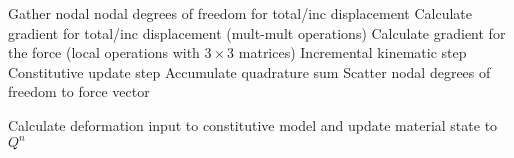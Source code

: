 \documentclass[11pt, oneside]{article}   	%
\begin{document}
\begin{algorithm}
\begin{algorithmic}[1]
\State Gather nodal nodal degrees of freedom for total/inc displacement
\State Calculate gradient for total/inc displacement (mult-mult operations)
\State Calculate gradient for the force (local operations with $3 \times 3$ matrices)
\State Incremental kinematic step
\State Constitutive update step
\State Accumulate quadrature sum
\EndFor
\State Scatter nodal degrees of freedom to force vector
\EndFor
\EndProcedure
\end{algorithmic}
\caption{Calculate deformation input to constitutive model and update material state to $Q^{n}$}
\end{algorithm}
\end{document}
